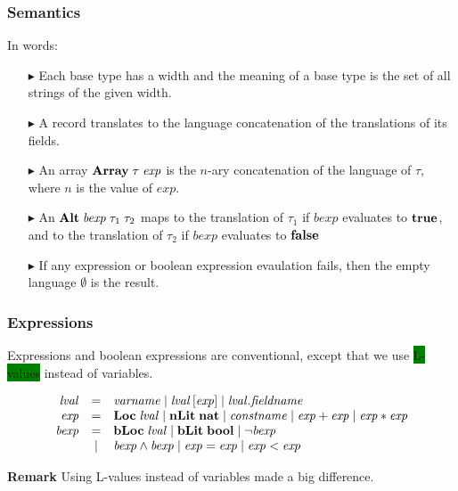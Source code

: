 \documentclass{beamer}
\newcommand{\gemph}[1]{\colorbox{green}{#1}}
\newcommand{\konst}[1]{\ensuremath{\mbox{\bf{#1}}}}
\begin{document}
\begin{frame}[fragile]\frametitle{Semantics}

In words:

\begin{itemize}
\item [$\blacktriangleright$] Each base type has a width and the meaning of a base type is the
  set of all strings of the given width.

\item [$\blacktriangleright$] A record translates to the language concatenation of the translations of its fields.

\item [$\blacktriangleright$] An array $\konst{Array}\;\tau\; \mathit{exp}$ is the $n$-ary
  concatenation of the language of $\tau$, where $n$ is the value of
  $\mathit{exp}$.

\item [$\blacktriangleright$] An $\konst{Alt}\; \mathit{bexp} \;
  \tau_1 \; \tau_2$ maps to the translation of $\tau_1$ if
  $\mathit{bexp}$ evaluates to \konst{true}, and to the translation of
  $\tau_2$ if $\mathit{bexp}$ evaluates to \konst{false}

\item [$\blacktriangleright$] If any expression or boolean expression
  evaulation fails, then the empty language $\emptyset$ is the result.

\end{itemize}

\end{frame}

\begin{frame}\frametitle{Expressions}

Expressions and boolean expressions are conventional, except that we
use \gemph{L-values} instead of variables.

\[
\begin{array}{rcl}
\mathit{lval} & = & \mathit{varname} \mid
                    \mathit{lval} \, [ \mathit{exp} ] \mid
                    \mathit{lval} . \mathit{fieldname} \\
\mathit{exp} & = & \konst{Loc}\; \mathit{lval}
              \mid \konst{nLit}\; \konst{nat}
              \mid \mathit{constname}
              \mid \mathit{exp} + \mathit{exp}
              \mid \mathit{exp} * \mathit{exp} \\
\mathit{bexp} & = & \konst{bLoc}\; \mathit{lval}
              \mid  \konst{bLit}\; \konst{bool}
              \mid  \neg \mathit{bexp} \\
& \mid &  \mathit{bexp} \land \mathit{bexp}
              \mid  \mathit{exp} = \mathit{exp}
              \mid  \mathit{exp} < \mathit{exp}
\end{array}
\]

\textbf{Remark} Using L-values instead of variables made a big difference.

\end{frame}
\end{document}
